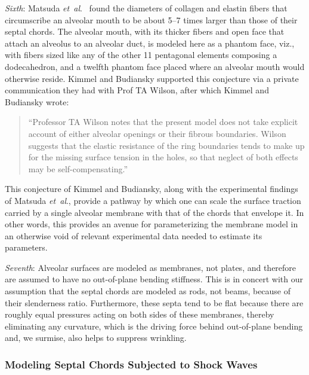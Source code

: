 \textit{Sixth\/}: Matsuda \textit{et~al}.\ \cite{Matsudaetal87} found the diameters of collagen and elastin fibers that circumscribe an alveolar mouth to be about 5--7 times larger than those of their septal chords.  The alveolar mouth, with its thicker fibers and open face that attach an alveolus to an alveolar duct, is modeled here as a phantom face, viz., with fibers sized like any of the other 11 pentagonal elements composing a dodecahedron, and a twelfth phantom face placed where an alveolar mouth would otherwise reside. \cite{Freedetal12}  Kimmel and Budiansky supported this conjecture via a private communication they had with Prof TA Wilson, after which  Kimmel and Budiansky wrote: \cite{KimmelBudiansky90}
\small
\begin{quote}
    ``Professor TA Wilson notes that the present model does not take explicit account of either alveolar openings or their fibrous boundaries.  Wilson suggests that the elastic resistance of the ring boundaries tends to make up for the missing surface tension in the holes, so that neglect of both effects may be self-compensating.''
\end{quote}
\normalsize
This conjecture of Kimmel and Budiansky, \cite{KimmelBudiansky90} along with the experimental findings of Matsuda \textit{et~al}., \cite{Matsudaetal87} provide a pathway by which one can scale the surface traction carried by a single alveolar membrane with that of the chords that envelope it.  In other words, this provides an avenue for parameterizing the membrane model in an other\-wise void of relevant experimental data needed to estimate its parameters.

\textit{Seventh\/}: Alveolar surfaces are modeled as membranes, not plates, and therefore are assumed to have no out-of-plane bending stiffness.  This is in concert with our assumption that the septal chords are modeled as rods, not beams, because of their slenderness ratio.  Furthermore, these septa tend to be flat because there are roughly equal pressures acting on both sides of these membranes, thereby eliminating any curvature, which is the driving force behind out-of-plane bending \cite{HoppinHildebrandt77} and, we surmise, also helps to suppress wrinkling.

\subsubsection{Modeling Septal Chords Subjected to Shock Waves}

